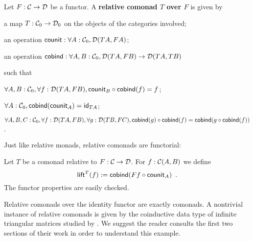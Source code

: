\documentclass{amsart}
\newcommand{\fat}[1]{\textbf{#1}}
\begin{document}
\begin{definition}\label{def:rel_comonad}
  Let $F:\C\to\D$ be a functor. A \fat{relative comonad $T$ over $F$} is given by
  \begin{packitem}
   \item a map $T:\C_0 \to \D_0$ on the objects of the categories involved;
   \item an operation $\counit : \forall A : \C_0, \D(TA,FA)$;
   \item an operation $\cobind: \forall A,B:\C_0, \D(TA,FB) \to \D(TA,TB)$
  \end{packitem}
  such that 
  \begin{packitem}
   \item $\forall A,B:\C_0, \forall f:\D(TA,FB), \comp{\cobind(f)}{\counit_B} = f$;
   \item $\forall A : \C_0, \cobind(\counit_A) = \id_{TA}$;
   \item $\forall A,B,C:\C_0, \forall f : \D(TA,FB),\forall g:\D(TB,FC), \\
        \comp{\cobind(f)}{\cobind(g)} = \cobind(\comp{\cobind(f)}{g})$.
  \end{packitem} 
\end{definition}
Just like relative monads, relative comonads are functorial:
\begin{definition}\label{def:lift}
 Let $T$ be a  comonad relative to $F:\C\to\D$.
 For $f : \C(A,B)$ we define
  \[ \lift^T(f) := \cobind(\comp{\counit_A}{Ff}) \enspace .  \]
 The functor properties are easily checked.
\end{definition}
Relative comonads over the identity functor are exactly comonads.
A nontrivial instance of relative comonads is given by the coinductive data type of infinite triangular matrices
studied by \textcite{DBLP:conf/types/MatthesP11}. We suggest the reader consults the first two sections of their work
in order to understand this example.
\end{document}

